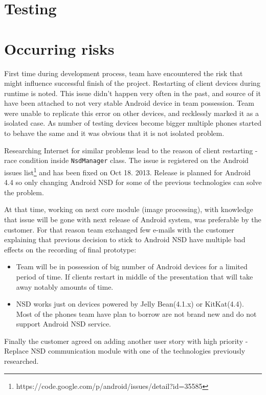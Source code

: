 \section{Testing}
\section{Occurring risks}
First time during development process, team have encountered the risk that might influence successful finish of the project. 
Restarting of client devices during runtime is noted. This issue didn't happen very often in the past, and source of it have been attached to not very stable Android device in team possession. Team were unable to replicate this error on other devices, and recklessly marked it as a isolated case. As number of testing devices become bigger multiple phones started to behave the same and it was obvious that it is not isolated problem. 

Researching Internet for similar problems lead to the
reason of client restarting - race condition inside \texttt{NsdManager} class. The issue is registered on the Android issues list\footnote{https://code.google.com/p/android/issues/detail?id=35585} and has been fixed on Oct 18. 2013. Release is planned for Android 4.4 so only changing Android NSD for some of the previous technologies can solve the problem. 

At that time, working on next core module (image processing), with knowledge that issue will be gone with next release of Android system, was preferable by the customer. For that reason team exchanged few e-mails with the customer explaining that previous decision to stick to Android NSD have multiple bad effects on the recording of final prototype:
\begin{itemize}
\item Team will be in possession of big number of Android devices for a limited period of time. If clients restart in middle of the presentation that will take away notably amounts of time.

\item NSD works just on devices powered by Jelly Bean(4.1.x) or KitKat(4.4). Most of the phones team have plan to borrow are not brand new and do not support Android NSD service.
\end{itemize}

Finally the customer agreed on adding another user story with high priority - Replace NSD communication module with one of the technologies previously researched.


